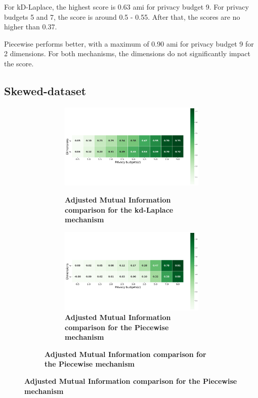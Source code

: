 {{For kD-Laplace, the highest score is 0.63 \gls{ami} for privacy budget 9. For privacy budgets 5 and 7, the score is around 0.5 - 0.55. After that, the scores are no higher than 0.37.

Piecewise performs better, with a maximum of 0.90 \gls{ami} for privacy budget 9 for 2 dimensions. For both mechanisms, the dimensions do not significantly impact the score.
\newpage
\subsection{Skewed-dataset}
\begin{figure}[H]
  \centering
  \begin{subfigure}[b]{0.85\textwidth}
    \begin{subfigure}[c]{1\textwidth}
      \caption{\textbf{Adjusted Mutual Information comparison for the kd-Laplace mechanism}}
      \includegraphics[width=1\textwidth]{Results/nd-laplace/nd-Laplace/skewed-dataset/ami.png}
      \label{fig:ami_skewed-dataset_comparison_kdlaplace_2d}
    \end{subfigure}
    \vfill %
    \begin{subfigure}[c]{1\textwidth}
      \caption{\textbf{Adjusted Mutual Information comparison for the Piecewise mechanism}}
      \includegraphics[width=1\textwidth]{Results/nd-laplace/piecewise/skewed-dataset/ami.png}

\end{subfigure}
\end{subfigure}
\end{figure}}}
